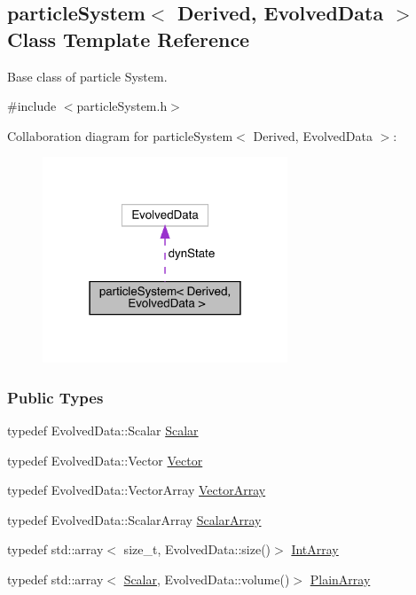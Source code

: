 \hypertarget{classparticle_system}{}\subsection{particle\+System$<$ Derived, Evolved\+Data $>$ Class Template Reference}
\label{classparticle_system}


Base class of particle System.  




{\ttfamily \#include $<$particle\+System.\+h$>$}



Collaboration diagram for particle\+System$<$ Derived, Evolved\+Data $>$\+:\nopagebreak
\begin{figure}[H]
\begin{center}
\leavevmode
\includegraphics[width=207pt]{classparticle_system__coll__graph}
\end{center}
\end{figure}
\subsubsection*{Public Types}
\begin{DoxyCompactItemize}
\item 
typedef Evolved\+Data\+::\+Scalar \mbox{\hyperlink{classparticle_system_a28e49da72c0ca5786d0611e6128a8994}{Scalar}}
\item 
typedef Evolved\+Data\+::\+Vector \mbox{\hyperlink{classparticle_system_ab7ee6005b0bed27658db2fa983def5ec}{Vector}}
\item 
typedef Evolved\+Data\+::\+Vector\+Array \mbox{\hyperlink{classparticle_system_a6f66ed187a286c0d42ab2f83b8b6193b}{Vector\+Array}}
\item 
typedef Evolved\+Data\+::\+Scalar\+Array \mbox{\hyperlink{classparticle_system_af7f328120ff85c8b34edeed4a68b746e}{Scalar\+Array}}
\item 
typedef std\+::array$<$ size\+\_\+t, Evolved\+Data\+::size()$>$ \mbox{\hyperlink{classparticle_system_aee9dc82f46ce17a477251805094cf19f}{Int\+Array}}
\item 
typedef std\+::array$<$ \mbox{\hyperlink{classparticle_system_a28e49da72c0ca5786d0611e6128a8994}{Scalar}}, Evolved\+Data\+::volume()$>$ \mbox{\hyperlink{classparticle_system_ae5a7215810a9f2cad5508aca6b26a063}{Plain\+Array}}
\end{DoxyCompactItemize}
